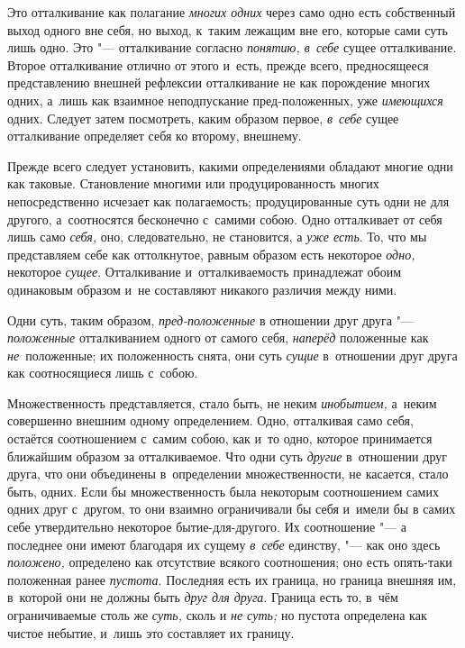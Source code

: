Это отталкивание как полагание {\em многих одних} через
само одно есть собственный выход одного вне себя, но выход, к~таким лежащим
вне его, которые сами суть лишь одно. Это "--- отталкивание согласно
{\em понятию, в~себе} сущее
отталкивание. Второе отталкивание отлично от этого и~есть, прежде всего,
предносящееся представлению внешней рефлексии отталкивание не как
порождение многих одних, а~лишь как взаимное неподпускание пред-положенных,
уже {\em имеющихся} одних. Следует затем посмотреть,
каким образом первое, {\em в~себе} сущее отталкивание
определяет себя ко второму, внешнему.

Прежде всего следует установить, какими определениями обладают многие одни
как таковые. Становление многими или продуцированность многих
непосредственно исчезает как полагаемость; продуцированные суть одни не для
другого, а~соотносятся бесконечно с~самими собою. Одно отталкивает от себя
лишь само {\em себя,} оно, следовательно, не
становится, а {\em уже есть}. То, что мы представляем
себе как оттолкнутое, равным образом есть некоторое
{\em одно,} некоторое {\em сущее}.
Отталкивание и~отталкиваемость принадлежат обоим одинаковым образом и~не
составляют никакого различия между ними.

Одни суть, таким образом, {\em пред-положенные} в
отношении друг друга "--- {\em положенные} отталкиванием
одного от самого себя, {\em наперёд} положенные как
{\em не}~положенные; их положенность снята, они суть
{\em сущие} в~отношении друг друга как соотносящиеся лишь с~собою.

Множественность представляется, стало быть, не неким
{\em инобытием,} а~неким совершенно внешним одному
определением. Одно, отталкивая само себя, остаётся соотношением с~самим
собою, как и~то одно, которое принимается ближайшим образом за
отталкиваемое. Что одни суть {\em другие} в~отношении
друг друга, что они объединены в~определении множественности, не касается,
стало быть, одних. Если бы множественность была некоторым соотношением
самих одних друг с~другом, то они взаимно ограничивали бы себя и~имели бы в
самих себе утвердительно некоторое бытие-для-другого. Их соотношение "--- а
последнее они имеют благодаря их сущему {\em в~себе}
единству, "--- как оно здесь {\em положено,} определено
как отсутствие всякого соотношения; оно есть опять-таки положенная ранее
{\em пустота}. Последняя есть их граница, но граница
внешняя им, в~которой они не должны быть {\em друг для
друга}. Граница есть то, в~чём ограничиваемые столь же
{\em суть,} сколь и {\em не суть;}
но пустота определена как чистое небытие, и~лишь это составляет их границу.

